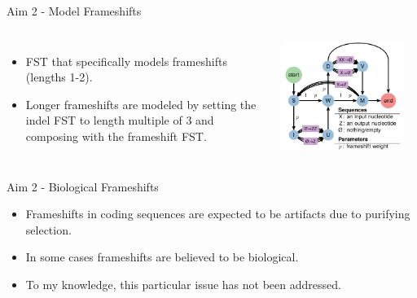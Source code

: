 \documentclass{beamer}
\begin{document}
\begin{frame}{Aim 2 - Model Frameshifts} %
\begin{columns}
\begin{itemize}
	\setlength\itemsep{1em}
	\item FST that specifically models frameshifts (lengths 1-2).
	\item Longer frameshifts are modeled by setting the indel FST to length
		multiple of 3 and composing with the frameshift FST.
\end{itemize}
\includegraphics[width=0.9\textwidth]{fig-fst-frameshifts.pdf}
\end{columns}
\end{frame} %

\begin{frame}{Aim 2 - Biological Frameshifts} %
\begin{itemize}
	\setlength\itemsep{1em}
	\item Frameshifts in coding sequences are expected to be artifacts due to
		purifying selection.
	\item In some cases frameshifts are believed to be biological.
	\item To my knowledge, this particular issue has not been addressed.
\end{itemize}

\end{frame} %
\end{document}
